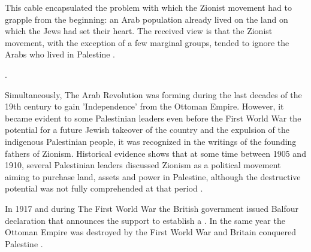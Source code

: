 \centerline{\textit{}}

This cable encapsulated the problem with which the Zionist movement had to grapple from the beginning: an Arab population already lived on the land on which the Jews had set their heart. The received view is that the Zionist movement, with the exception of a few marginal groups, tended to ignore the Arabs who lived in Palestine \citep{Shlaim2014}\citep{Karmi2007}.

 \cite[p.11]{Pappe2006}.


Simultaneously, The Arab Revolution was forming during the last decades of the 19th century to gain 'Independence' from the Ottoman Empire. However, it became evident to some Palestinian leaders even before the First World War the potential for a future Jewish takeover of the country and the expulsion of the indigenous Palestinian people, it was recognized in the writings of the founding fathers of Zionism. Historical evidence shows that at some time between 1905 and 1910, 
several Palestinian leaders discussed Zionism as a political movement 
aiming to purchase land, assets and power in Palestine, although the 
destructive potential was not fully comprehended at that period \citep{Pappe2006}.



 In 1917 and during The First World War the British government issued Balfour declaration that  announces the support to establish a . In the same year the Ottoman Empire was destroyed by the First World War and Britain conquered Palestine \citep{Morris2004}.  
 
 
 
